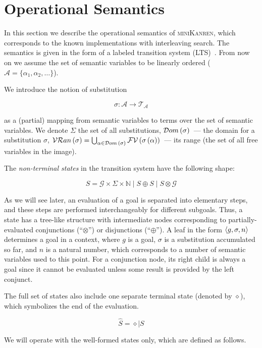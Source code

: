\section{Operational Semantics}
\label{operational}

In this section we describe the operational semantics of \textsc{miniKanren}, which corresponds to the known
implementations with interleaving search. The semantics is given in the form of a labeled transition system (LTS)~\cite{LTS}. From now on we
assume the set of semantic variables to be linearly ordered ($\mathcal{A}=\{\alpha_1,\alpha_2,\dots\}$).

We introduce the notion of substitution

\[
  \sigma : \mathcal{A}\to\mathcal{T_A}
\]

\noindent as a (partial) mapping from semantic variables to terms over the set of semantic variables. We denote $\Sigma$ the
set of all substitutions, $\mathcal{D}om\,({\sigma})$~--- the domain for a substitution $\sigma$,
$\mathcal{VR}an\,({\sigma})=\bigcup_{\alpha\in\mathcal{D}om\,(\sigma)}\mathcal{FV}\,({\sigma\,(\alpha)})$~--- its range (the set of all free variables in the image).

The \emph{non-terminal states} in the transition system have the following shape:

\[
S = \mathcal{G}\times\Sigma\times\mathbb{N}\mid S\oplus S \mid S \otimes \mathcal{G}
\]

As we will see later, an evaluation of a goal is separated into elementary steps, and these steps are performed interchangeably for different subgoals. 
Thus, a state has a tree-like structure with intermediate nodes corresponding to partially-evaluated conjunctions (``$\otimes$'') or
disjunctions (``$\oplus$''). A leaf in the form $\left<{g, \sigma, n}\right>$ determines a goal in a context, where $g$ is a goal, $\sigma$ is a substitution accumulated so far,
and $n$ is a natural number, which corresponds to a number of semantic variables used to this point. For a conjunction node, its right child is always a goal since
it cannot be evaluated unless some result is provided by the left conjunct.

The full set of states also include one separate terminal state (denoted by $\diamond$), which symbolizes the end of the evaluation.

\[
\hat{S} = \diamond \mid S
\]

We will operate with the well-formed states only, which are defined as follows.

